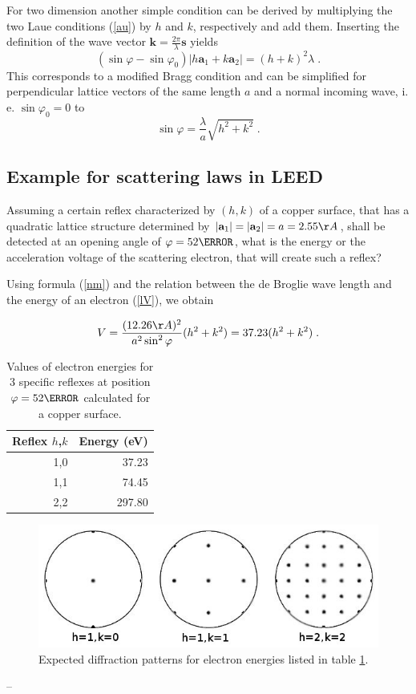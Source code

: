 \documentclass[a4paper]{scrartcl}
\numberwithin{equation}{section}
\numberwithin{figure}{section}
\numberwithin{table}{section}
\newcommand{\eq}[2]{\begin{equation}#1\label{#2}\end{equation}}
\newcommand{\Formel}[1]{(\ref{#1})}
\newcommand{\ve}[1]{\mathbf{ #1} }
\begin{document}
For two dimension another simple condition can be derived by multiplying the two Laue conditions \Formel{au} by $h$ and $k$, respectively and add them. Inserting the definition of the wave vector $\ve k=\frac{2\pi}{\lambda} \ve s$ yields
\eq{(\sin \varphi - \sin \varphi_0) |h \ve a_1 + k \ve a_2| = (h + k)^2 \lambda \; .} {}
This corresponds to a modified Bragg condition and can be simplified for perpendicular lattice vectors of the same length $a$ and a normal incoming wave, i. e. $\sin \varphi_0  =0$ to
\eq{\sin \varphi =\frac{\lambda}{a} \sqrt{h^2+k^2} \; .}{nm}

\subsection{Example for scattering laws in LEED}
Assuming a certain reflex characterized by $(h,k)$ of a copper surface, that has a quadratic lattice structure determined by $|\ve a_1|=|\ve a_2|=a=2.55 \AA$, shall be detected at an opening angle of $\varphi = 52 \degree$, what is the energy or the acceleration voltage of the scattering electron, that will create such a reflex?

Using formula \Formel{nm} and the relation between the de Broglie wave length and the energy of an electron \Formel{lV}, we obtain

\eq{ V =\frac{(12.26 \AA)^2}{a^2 \sin^2 \varphi} (h^2+k^2) = 37.23 (h^2 +k^2) \; .}{V}

\begin{table}[!h]
\centering
\begin{tabular}{rr}
\toprule
Reflex $h$,$k$ & Energy (eV) \\
\midrule
1,0 & 37.23 \\
1,1 & 74.45 \\
2,2 & 297.80 \\
 \bottomrule
\end{tabular}
\caption{\small Values of electron energies for 3 specific reflexes at position $\varphi =52\degree$ calculated for a copper surface. }
\label{kll}
\end{table}

\begin{figure}
  \centering
   	\includegraphics[width=0.7\linewidth]{pic/52.jpeg}

 \caption{\small Expected diffraction patterns for electron energies listed in table \ref{kll}.}
        \label{fig:bragg2}
\end{figure}
--
\end{document}
